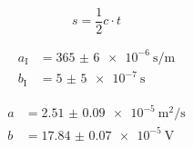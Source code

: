 \begin{equation}
    s = \frac{1}{2} c \cdot t
    \label{eq:strecke}
\end{equation}

\begin{align}
    a_\text{I} &= \SI{365(6)e-6}{\second\per\meter} 
    \label{eq:first} \\
    b_\text{I} &= \SI{5(5)e-7}{\second}
    \label{eq:second}
\end{align}

\begin{align*}
    a &= \SI{2.51(9)e-5}{\meter\squared\per\second} \\
    b &= \SI{17.84(7)e-5}{\volt}
\end{align*}

